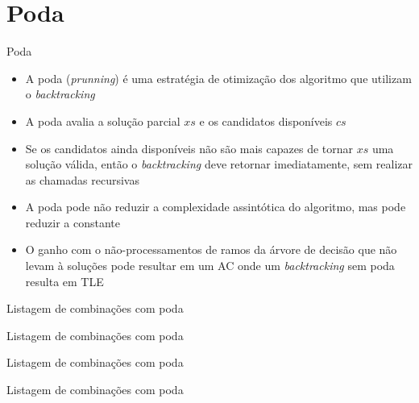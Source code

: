 \section{Poda}

\begin{frame}[fragile]{Poda}

    \begin{itemize}
        \item A poda (\textit{prunning}) é uma estratégia de otimização dos algoritmo que 
            utilizam o \textit{backtracking}

        \item A poda avalia a solução parcial $xs$ e os candidatos disponíveis $cs$

        \item Se os candidatos ainda disponíveis não são mais capazes de tornar $xs$ uma solução
            válida, então o \textit{backtracking} deve retornar imediatamente, sem realizar
            as chamadas recursivas

        \item A poda pode não reduzir a complexidade assintótica do algoritmo, mas pode reduzir
            a constante

        \item O ganho com o não-processamentos de ramos da árvore de decisão que não levam à
            soluções pode resultar em um AC onde um \textit{backtracking} sem poda resulta em
            TLE
    \end{itemize}

\end{frame}

\begin{frame}[fragile]{Listagem de combinações com poda}
\end{frame}

\begin{frame}[fragile]{Listagem de combinações com poda}
\end{frame}

\begin{frame}[fragile]{Listagem de combinações com poda}
\end{frame}

\begin{frame}[fragile]{Listagem de combinações com poda}
\end{frame}
